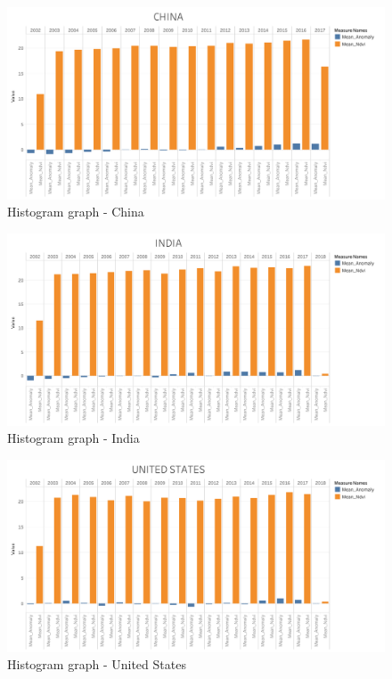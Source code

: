 \begin{itemize}
    \begin{figure}[H]
            \centering
            \includegraphics[width=1.0\linewidth]{figures/ch5/Histograms/CHINA_histogram.png}
            \caption{Histogram graph - China}\label{Fig:CHINA_histogram}
    \end{figure}
    
    
    \begin{figure}[H]
            \centering
            \includegraphics[width=1.0\linewidth]{figures/ch5/Histograms/INDIA_histogram.png}
            \caption{Histogram graph - India}\label{Fig:INDIA_histogram}
    \end{figure}
    
   
     \begin{figure}[H]
            \centering
            \includegraphics[width=1.0\linewidth]{figures/ch5/Histograms/US_histogram.png}
            \caption{\label{fig:US_histogram} Histogram graph - United States}
    \end{figure}
\newpage

\end{itemize}


